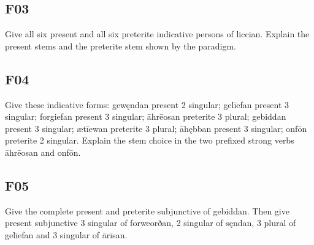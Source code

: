 \par\begin{minipage}{\linewidth}\raggedright
\subsection*{F03}

Give all six present and all six preterite indicative persons of liccian. Explain the present stems and the preterite stem shown by the paradigm.

\end{minipage}\par\addvspace{4pt}

\par\begin{minipage}{\linewidth}\raggedright
\subsection*{F04}

Give these indicative forms: gewęndan present 2 singular; gelīefan present 3 singular; forgiefan present 3 singular; āhrēosan preterite 3 plural; gebiddan present 3 singular; ætīewan preterite 3 plural; āhębban present 3 singular; onfōn preterite 2 singular. Explain the stem choice in the two prefixed strong verbs āhrēosan and onfōn.

\end{minipage}\par\addvspace{4pt}

\par\begin{minipage}{\linewidth}\raggedright
\subsection*{F05}

Give the complete present and preterite subjunctive of gebiddan. Then give present subjunctive 3 singular of forweorðan, 2 singular of sęndan, 3 plural of gelīefan and 3 singular of ārīsan.

\end{minipage}\par\addvspace{4pt}

